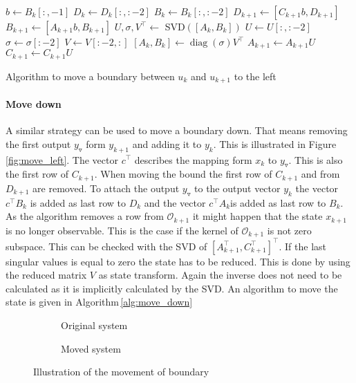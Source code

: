 \documentclass[doctype=mastersthesis,BCOR=15mm,biblatex]{ldvbook}%
\DeclareMathOperator{\diag}{diag}
\newcommand{\Ob}{\mathcal{O}} %
\newcommand{\m}{\triangledown} %
\begin{document}
\begin{algorithm}[htb]
	\begin{algorithmic}
		\State $b \gets B_k[:,-1]$
		\State $D_k \gets D_k[:,:-2]$
		\State $B_k \gets B_k[:,:-2]$
		\State $D_{k+1} \gets [C_{k+1}b,D_{k+1}]$
		\State $B_{k+1} \gets [A_{k+1}b,B_{k+1}]$
		\State $U,\sigma,V^\top \gets$ SVD$([A_k,B_k])$ 
			\State $U \gets U[:,:-2]$
			\State $\sigma \gets \sigma[:-2]$
			\State $V \gets V[:-2,:]$
			\State$[A_k,B_k] \gets \diag(\sigma) V^\top$
			\State$A_{k+1} \gets A_{k+1}U$
			\State$C_{k+1} \gets C_{k+1}U$
		\EndIf
	\end{algorithmic}
	\caption{Algorithm to move a boundary between $u_k$ and $u_{k+1}$ to the left}\label{alg:move_left}
\end{algorithm}

\paragraph{Move down}
A similar strategy can be used to move a boundary down.
That means removing the first output $y_\m$ form $y_{k+1}$ and adding it to $y_k$.
This is illustrated in Figure\,\ref{fig:move_left}.
The vector $c^\top$ describes the mapping form $x_k$ to $y_\m$.
This is also the first row of $C_{k+1}$.
When moving the bound the first row of $C_{k+1}$ and from $D_{k+1}$ are removed.
To attach the output $y_\m$ to the output vector $y_k$ the vector $c^\top B_k$ is added as last row to $D_k$ and the vector $c^\top A_k$is added as last row to $B_k$.
As the algorithm removes a row from $\Ob_{k+1}$ it might happen that the state $x_{k+1}$ is no longer observable.
This is the case if the kernel of $\Ob_{k+1}$ is not zero subspace.
This can be checked with the SVD of $[A_{k+1}^\top,C_{k+1}^\top]^\top$.
If the last singular values is equal to zero the state has to be reduced.
This is done by using the reduced matrix $V$ as state transform.
Again the inverse does not need to be calculated as it is implicitly calculated by the SVD.
An algorithm to move the state is given in Algorithm\,\ref{alg:move_down}



\begin{figure}[htb]
	\centering
	
	\begin{subfigure}[b]{0.45\textwidth}
		\caption{Original system}
		\label{fig:move_down_a}
	\end{subfigure}
	\hspace{0.8cm}
	\begin{subfigure}[b]{0.45\textwidth}
		\caption{Moved system}
		\label{fig:move_down_b}
	\end{subfigure}
	\caption{Illustration of the movement of boundary}
	\label{fig:move_down}
\end{figure}
\end{document}
